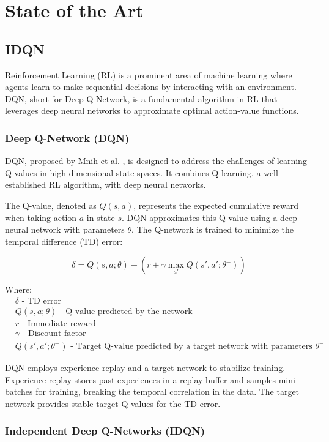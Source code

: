 \chapter{State of the Art}
\section{IDQN}\label{sec:IDQN}
Reinforcement Learning (RL) is a prominent area of machine learning where agents learn to make sequential decisions by interacting with an environment. DQN, short for Deep Q-Network, is a fundamental algorithm in RL that leverages deep neural networks to approximate optimal action-value functions.

\subsection{Deep Q-Network (DQN)}

DQN, proposed by Mnih et al. \cite{mnih2015human}, is designed to address the challenges of learning Q-values in high-dimensional state spaces. It combines Q-learning, a well-established RL algorithm, with deep neural networks.

The Q-value, denoted as \(Q(s, a)\), represents the expected cumulative reward when taking action \(a\) in state \(s\). DQN approximates this Q-value using a deep neural network with parameters \(\theta\). The Q-network is trained to minimize the temporal difference (TD) error:

\[
\delta = Q(s, a;\theta) - (r + \gamma \max_{a'} Q(s', a';\theta^-))
\]

Where:
\begin{align*}
    &\delta \text{ - TD error}\\
    &Q(s, a;\theta) \text{ - Q-value predicted by the network}\\
    &r \text{ - Immediate reward}\\
    &\gamma \text{ - Discount factor}\\
    &Q(s', a';\theta^-) \text{ - Target Q-value predicted by a target network with parameters }\theta^-
\end{align*}

DQN employs experience replay and a target network to stabilize training. Experience replay stores past experiences in a replay buffer and samples mini-batches for training, breaking the temporal correlation in the data. The target network provides stable target Q-values for the TD error.

\subsection{Independent Deep Q-Networks (IDQN)}

